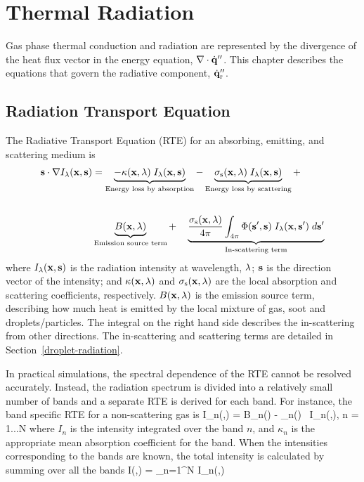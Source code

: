 

\chapter{Thermal Radiation}
\label{chapter:radiation}

Gas phase thermal conduction and radiation are represented by the divergence of the heat flux vector in the energy equation, $\nabla \cdot \dot{\mathbf{q}}''$. This chapter describes the equations that govern the radiative component, $\dot{\mathbf{q}}''_{\rm r}$.


\section{Radiation Transport Equation}
\label{RTEsection}

The Radiative Transport Equation (RTE) for an absorbing, emitting, and scattering medium is
\begin{align}
{\mathbf{s}} \cdot \nabla I_{\lambda}({\mathbf{x}},{\mathbf{s}}) &=
\underbrace{ - \kappa({\mathbf{x}},\lambda)   \; I_\lambda({\mathbf{x}},{\mathbf{s}}) }_{\textrm{Energy loss by absorption}} -
\underbrace{\sigma_{\rm s}({\mathbf{x}},\lambda) \; I_\lambda({\mathbf{x}},{\mathbf{s}}) }_{\textrm{Energy loss by scattering}} +  \notag \\[0.25in]
& \underbrace{   B({\mathbf{x}},\lambda) }_{\textrm{Emission source term}} + \quad
\underbrace{   \frac{\sigma_{\rm s}({\mathbf{x}},\lambda)}{4\pi}
\int_{4\pi}\Phi({\mathbf{s}}',{\mathbf{s}}) \; I_{\lambda}({\mathbf{x}},{\mathbf{s}}') \; d{\mathbf{s}}'
 }_{\textrm{In-scattering term}}
\label{RTEbasic}
\end{align}
where $I_{\lambda}({\mathbf{x}},{\mathbf{s}})$ is the radiation intensity at wavelength, $\lambda$; ${\mathbf{s}}$ is the direction vector of the intensity; and $\kappa({\mathbf{x}},\lambda)$ and $\sigma_{\rm s}({\mathbf{x}},\lambda)$ are the local absorption and scattering coefficients, respectively. $B({\mathbf{x}},\lambda)$ is the emission source term, describing how much heat is emitted by the local mixture of gas, soot and droplets/particles. The integral on the right hand side describes the in-scattering from other directions. The in-scattering and scattering terms are detailed in Section~\ref{droplet-radiation}.

In practical simulations, the spectral dependence of the RTE cannot be resolved accurately. Instead, the radiation spectrum is divided into a relatively small number of bands and a separate RTE is derived for each band. For instance, the band specific RTE for a non-scattering gas is
\be
   \bs \cdot \nabla I_n(\bx,\bs) = B_n(\bx) - \kappa_n(\bx) \, I_n(\bx,\bs),\;\; n = 1...N  \label{bandRTE}
\ee
where $I_n$ is the intensity integrated over the band $n$, and $\kappa_n$ is the appropriate mean absorption coefficient for the band. When the intensities corresponding to the bands are known, the total intensity is calculated by summing over all the bands
\be
   I(\bx,\bs) = \sum_{n=1}^N I_n(\bx,\bs)
\ee

